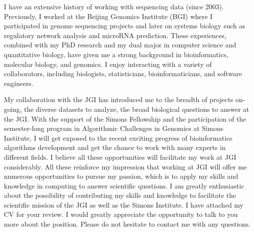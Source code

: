 \documentclass[10pt,a4paper,sans]{moderncv}        %
\begin{document}
I have an extensive history of working with sequencing data (since 2003).  Previously, I worked at the Beijing Genomics Institute (BGI) where I participated in genome sequencing projects and later on systems biology such as regulatory network analysis and microRNA prediction. These experiences, combined with my PhD research and my dual major in computer science and quantitative biology, have given me a strong background in bioinformatics, molecular biology, and genomics.  I enjoy interacting with a variety of collaborators, including biologists, statisticians, bioinformaticians, and software engineers. 

My collaboration with the JGI has introduced me to the breadth of projects on-going, the diverse datasets to analyze, the broad biological questions to answer at the JGI. With the support of the Simons Fellowship and the participation of the semester-long program in Algorithmic Challenges in Genomics at Simons Institute, I will get exposed to the recent exciting progress  of bioinformatics algorithms development and get the chance to work with many experts in different fields. I believe all these opportunities will facilitate my work at JGI considerably.  All these reinforce my impression that working at JGI will offer me numerous opportunities to pursue my passion, which is to apply my skills and knowledge in computing to answer scientific questions.  I am greatly enthusiastic about the possibility of contributing my skills and knowledge to facilitate the scientific mission of the JGI as well as the Simons Institute. I have attached my CV for your review. I would greatly appreciate the opportunity to talk to you more about the position. Please do not hesitate to contact me with any questions.



\makeletterclosing
\end{document}
